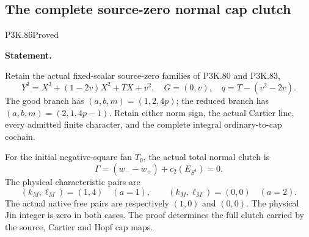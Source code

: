 \subsection{The complete source-zero normal cap clutch}
\begin{statement}{P3K.86}{Proved}
\par\medskip\noindent\textbf{Statement.}\par\nopagebreak[4]

Retain the actual fixed-scalar source-zero families of P3K.80 and P3K.83,
\[
 Y^2=X^3+(1-2v)X^2+TX+v^2,\quad G=(0,v),\quad
 q=T-(v^2-2v).
\]
The good branch has \((a,b,m)=(1,2,4p)\); the reduced branch has
\((a,b,m)=(2,1,4p-1)\). Retain either norm sign, the actual Cartier line, every admitted finite character, and the complete integral ordinary-to-cap cochain.

For the initial negative-square fan \(T_0\), the actual total normal clutch is
\[
 \Gamma=(w_--w_+)+c_2(E_{S^4})=0.
\]
The physical characteristic pairs are
\[
 (k_M,\ell_M)=(1,4)\quad(a=1),\qquad
 (k_M,\ell_M)=(0,0)\quad(a=2).
\]
The actual native free pairs are respectively \((1,0)\) and \((0,0)\). The physical Jin integer is zero in both cases. The proof determines the full clutch carried by the source, Cartier and Hopf cap maps.

\end{statement}
